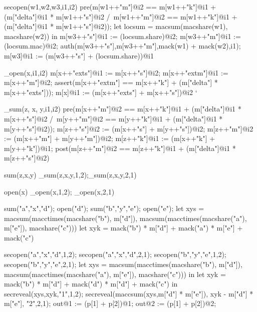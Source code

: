 \begin{verbatimtab}
  secopen(w1,w2,w3,i1,i2) {
      pre(m[w1++"m"]@i2 == m[w1++"k"]@i1 + (m["delta"]@i1 * m[w1++"s"]@i2 /\
          m[w1++"m"]@i2 == m[w1++"k"]@i1 + (m["delta"]@i1 * m[w1++"s"]@i2));
      let locsum =  macsum(macshare(w1), macshare(w2)) in
      m[w3++"s"]@i1 := (locsum.share)@i2;
      m[w3++"m"]@i1 := (locsum.mac)@i2;
      auth(m[w3++"s"],m[w3++"m"],mack(w1) + mack(w2),i1);
      m[w3]@i1 := (m[w3++"s"] + (locsum.share))@i1
  }

  
  _open(x,i1,i2){
    m[x++"exts"]@i1 := m[x++"s"]@i2;
    m[x++"extm"]@i1 := m[x++"m"]@i2;
    assert(m[x++"extm"] == m[x++"k"] + (m["delta"] * m[x++"exts"]));
    m[x]@i1 := (m[x++"exts"] + m[x++"s"])@i2
  }`
  
  _sum(z, x, y,i1,i2) {
      pre(m[x++"m"]@i2 == m[x++"k"]@i1 + (m["delta"]@i1 * m[x++"s"]@i2 /\
          m[y++"m"]@i2 == m[y++"k"]@i1 + (m["delta"]@i1 * m[y++"s"]@i2));
      m[z++"s"]@i2 := (m[x++"s"] + m[y++"s"])@i2;
      m[z++"m"]@i2 := (m[x++"m"] + m[y++"m"])@i2;
      m[z++"k"]@i1 := (m[x++"k"] + m[y++"k"])@i1;
      post(m[z++"m"]@i2 == m[z++"k"]@i1 + (m["delta"]@i1 * m[z++"s"]@i2)
  }

  sum(z,x,y) { _sum(z,x,y,1,2);_sum(z,x,y,2,1) }

  open(x) { _open(x,1,2); _open(x,2,1) } 


  sum("a","x","d");
  open("d");
  sum("b","y","e");
  open("e");
  let xys =
      macsum(macctimes(macshare("b"), m["d"]),
             macsum(macctimes(macshare("a"), m["e"]),
                    macshare("c")))
  let xyk = mack("b") * m["d"] + mack("a") * m["e"] + mack("c")
                    
  secopen("a","x","d",1,2);
    secopen("a","x","d",2,1);
    secopen("b","y","e",1,2);
    secopen("b","y","e",2,1);
    let xys =
      macsum(macctimes(macshare("b"), m["d"]),
             macsum(macctimes(macshare("a"), m["e"]),
                    macshare("c")))
    in
    let xyk = mack("b") * m["d"] + mack("d") * m["d"] + mack("c")               
    in
    secreveal(xys,xyk,"1",1,2);
    secreveal(maccsum(xys,m["d"] * m["e"]),
              xyk - m["d"] * m["e"],
              "2",2,1);
    out@1 := (p[1] + p[2])@1;
    out@2 := (p[1] + p[2])@2;
\end{verbatimtab}


